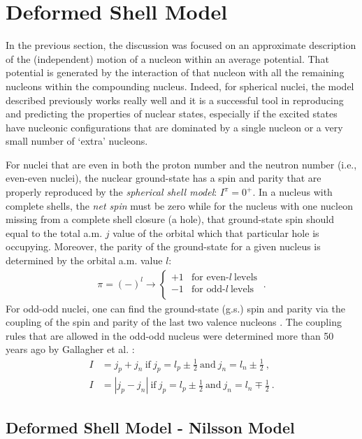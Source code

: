 \section{Deformed Shell Model}

In the previous section, the discussion was focused on an approximate description of the (independent) motion of a nucleon within an average potential. That potential is generated by the interaction of that nucleon with all the remaining nucleons within the compounding nucleus. Indeed, for spherical nuclei, the model described previously works really well and it is a successful tool in reproducing and predicting the properties of nuclear states, especially if the excited states have nucleonic configurations that are dominated by a single nucleon or a very small number of `extra' nucleons.

For nuclei that are even in both the proton number and the neutron number (i.e., even-even nuclei), the nuclear ground-state has a spin and parity that are properly reproduced by the \emph{spherical shell model}: $I^\pi=0^+$. In a nucleus with complete shells, the \emph{net spin} must be zero while for the nucleus with one nucleon missing from a complete shell closure (a hole), that ground-state spin should equal to the total a.m. $j$ value of the orbital which that particular hole is occupying. Moreover, the parity of the ground-state for a given nucleus is determined by the orbital a.m. value $l$:
\begin{align}\pi=(-)^l\to
    \begin{cases}
        +1 &\text{for even-}l\ \text{levels}\\
        -1 &\text{for odd-}l\ \text{levels}\\
   \end{cases}\ .
\end{align}
For odd-odd nuclei, one can find the ground-state (g.s.) spin and parity via the coupling of the spin and parity of the last two valence nucleons \cite{krane1991introductory,bertulani2007nuclear}. The coupling rules that are allowed in the odd-odd nucleus were determined more than 50 years ago by Gallagher et al. \cite{gallagher1958coupling}:
\begin{align}
    I&=j_p+j_n\ \text{if}\ j_p=l_p\pm\frac{1}{2}\ \text{and}\ j_n=l_n\pm\frac{1}{2}\ ,\\
    I&=|j_p-j_n|\ \text{if}\ j_p=l_p\pm\frac{1}{2}\ \text{and}\ j_n=l_n\mp\frac{1}{2}\ .
\end{align}

\subsection{Deformed Shell Model - Nilsson Model}
\label{nilsson-model-section}

